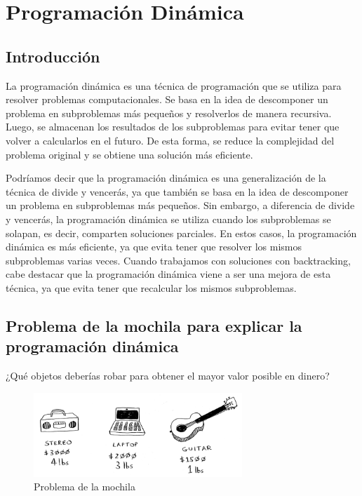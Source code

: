 \chapter{Programación Dinámica}

\section{Introducción}

La programación dinámica es una técnica de programación que se utiliza para resolver problemas computacionales. Se basa en la idea de descomponer un problema en subproblemas más pequeños y resolverlos de manera recursiva. Luego, se almacenan los resultados de los subproblemas para evitar tener que volver a calcularlos en el futuro. De esta forma, se reduce la complejidad del problema original y se obtiene una solución más eficiente.

Podríamos decir que la programación dinámica es una generalización de la técnica de divide y vencerás, ya que también se basa en la idea de descomponer un problema en subproblemas más pequeños. Sin embargo, a diferencia de divide y vencerás, la programación dinámica se utiliza cuando los subproblemas se solapan, es decir, comparten soluciones parciales. En estos casos, la programación dinámica es más eficiente, ya que evita tener que resolver los mismos subproblemas varias veces. Cuando trabajamos con soluciones con backtracking, cabe destacar que la programación dinámica viene a ser una mejora de esta técnica, ya que evita tener que recalcular los mismos subproblemas.

\section{Problema de la mochila para explicar la programación dinámica}
¿Qué objetos deberías robar para obtener el mayor valor posible en dinero?

\begin{figure}[h]
    \centering
    \includegraphics[width=0.7\textwidth]{estáticos/figura11.png}
    \caption{Problema de la mochila}
\end{figure}

